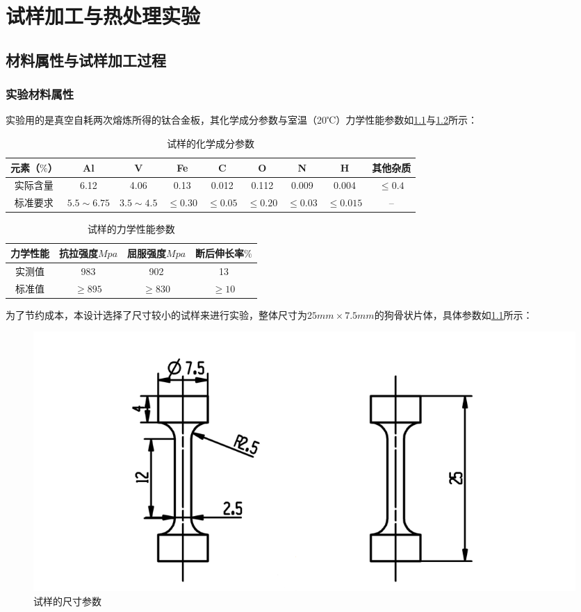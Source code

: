 \chapter{试样加工与热处理实验}
\section{材料属性与试样加工过程}
\subsection{实验材料属性}
实验用的是真空自耗两次熔炼所得的钛合金板，其化学成分参数与室温（20℃）力学性能参数如\ref{sec:mytc4chem}与\ref{sec:mytc4machin}所示：
\begin{table}[htbp]
	\centering
	\caption{试样的化学成分参数}
	\label{sec:mytc4chem}
	\begin{tabular}{ccccccccc}
		\toprule
		元素（$ \% $） & Al & V &Fe &C& O& N &H &其他杂质\\ \midrule
		实际含量 & 6.12&4.06 &0.13 &0.012&0.112&0.009&0.004 &$ \le 0.4 $ \\
		标准要求 &$ 5.5\sim 6.75 $ & $ 3.5\sim 4.5 $&$ \le 0.30 $ & $ \le 0.05 $&$ \le 0.20 $&$ \le 0.03$ &$ \le 0.015 $  & -- \\ \bottomrule
	\end{tabular}
\end{table}

\begin{table}[htbp]
	\centering
	\caption{试样的力学性能参数}
	\label{sec:mytc4machin}
	\begin{tabular}{cccc}
		\toprule
		力学性能& 抗拉强度$Mpa  $& 屈服强度$ Mpa $&断后伸长率$ \% $\\ \midrule
		实测值 & 983 &902 & 13\\
		标准值 &$ \ge 895 $&$ \ge 830 $&$ \ge 10 $ \\ \bottomrule
	\end{tabular}
\end{table}


为了节约成本，本设计选择了尺寸较小的试样来进行实验，整体尺寸为$ 25mm\times 7.5mm $的狗骨状片体，具体参数如\ref{fig:试样尺寸}所示：

\begin{figure}[h!]
	\centering
	\includegraphics[width=0.99\linewidth]{pic/试样}
	\caption{试样的尺寸参数}
	\label{fig:试样尺寸}
\end{figure}

